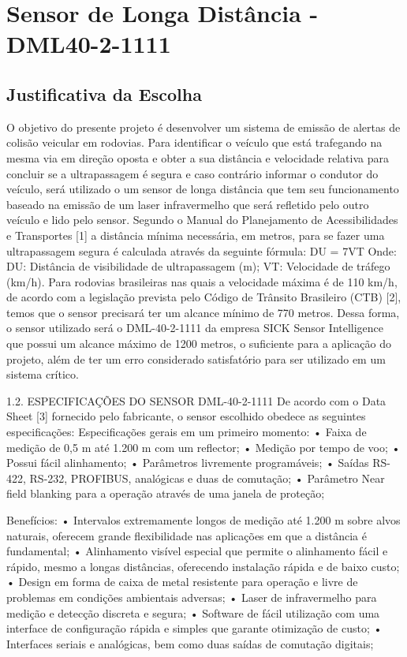 \section{Sensor de Longa Distância - DML40-2-1111}


\subsection{Justificativa da Escolha}
%

O objetivo do presente projeto é desenvolver um sistema de emissão de alertas de colisão veicular em rodovias. Para identificar o veículo que está trafegando na mesma via em direção oposta e obter a sua distância e velocidade relativa para concluir se a ultrapassagem é segura e caso contrário informar o condutor do veículo, será utilizado o um sensor de longa distância que tem seu funcionamento baseado na emissão de um laser infravermelho que será refletido pelo outro veículo e lido pelo sensor.
Segundo o Manual do Planejamento de Acessibilidades e Transportes [1] a distância mínima necessária, em metros, para se fazer uma ultrapassagem segura é calculada através da seguinte fórmula:
DU = 7VT
Onde:
DU: Distância de visibilidade de ultrapassagem (m);
VT: Velocidade de tráfego (km/h).
Para rodovias brasileiras nas quais a velocidade máxima é de 110 km/h, de acordo com a legislação prevista pelo Código de Trânsito Brasileiro (CTB) [2], temos que o sensor precisará ter um alcance mínimo de 770 metros.
Dessa forma, o sensor utilizado será o DML-40-2-1111 da empresa SICK Sensor Intelligence que possui um alcance máximo de 1200 metros, o suficiente para a aplicação do projeto, além de ter um erro considerado satisfatório para ser utilizado em um sistema crítico.

1.2.  ESPECIFICAÇÕES DO SENSOR DML-40-2-1111
De acordo com o Data Sheet [3] fornecido pelo fabricante, o sensor escolhido obedece as seguintes especificações:
Especificações gerais em um primeiro momento:
• Faixa de medição de 0,5 m até 1.200 m com um reflector;
• Medição por tempo de voo;
• Possui fácil alinhamento;
• Parâmetros livremente programáveis;
• Saídas RS-422, RS-232, PROFIBUS, analógicas e duas de comutação;
• Parâmetro Near field blanking para a operação através de uma janela de proteção;


Benefícios:
• Intervalos extremamente longos de medição até 1.200 m sobre alvos naturais, oferecem grande flexibilidade nas aplicações em que a distância é fundamental;
• Alinhamento visível especial que permite o alinhamento fácil e rápido, mesmo a longas distâncias, oferecendo instalação rápida e de baixo custo;
• Design em forma de caixa de metal resistente para operação e livre de problemas em condições ambientais adversas;
• Laser de infravermelho para medição e detecção discreta e segura;
• Software de fácil utilização com uma interface de configuração rápida e simples que garante otimização de custo;
• Interfaces seriais e analógicas, bem como duas saídas de comutação digitais;
